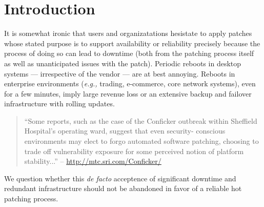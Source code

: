 \section{Introduction}
\label{sec:intro}

It is somewhat ironic that users and organizatations hesistate to
apply patches whose stated purpose is to support availability or
reliability precisely because the process of doing so can lead to
downtime (both from the patching process itself as well as
unanticipated issues with the patch).  Periodic reboots in desktop
systems --- irrespective of the vendor --- are at best annoying.
Reboots in enterprise environments ({\it e.g.,} trading, e-commerce,
core network systems), even for a few minutes, imply large revenue
loss or an extensive backup and failover infrastructure with rolling
updates.  
{\footnotesize
\begin{quote}
``Some reports, such as the case of the Conficker outbreak within 
Sheffield Hospital's operating ward, suggest that even security-
conscious environments may elect to forgo automated software patching, 
choosing to trade off vulnerability exposure for some perceived notion 
of platform stability...'' -- \url{http://mtc.sri.com/Conficker/}
\end{quote}
}
We question whether this {\em de facto} acceptence of
significant downtime and redundant infrastructure should not be
abandoned in favor of a reliable hot patching process.

%
%
%

